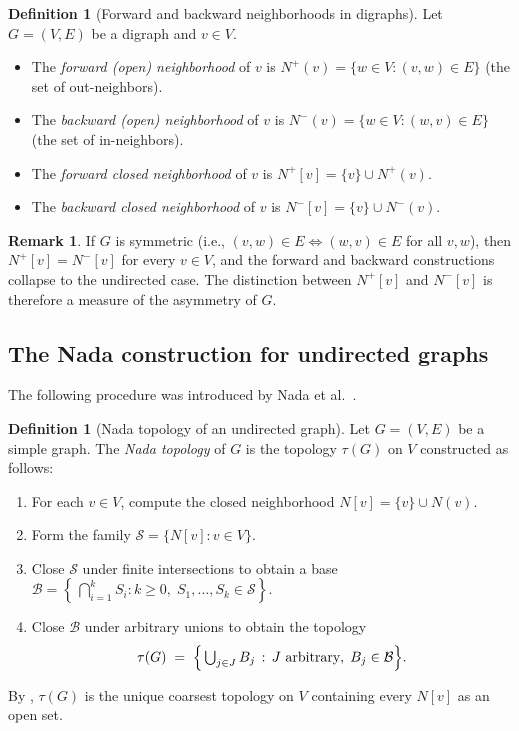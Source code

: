 \documentclass[11pt,a4paper]{article}
\theoremstyle{plain}
\theoremstyle{definition}
\newtheorem{definition}[theorem]{Definition}
\newtheorem{remark}[theorem]{Remark}
\newcommand{\Nfwd}[1]{N^{+}[#1]}
\newcommand{\Nbwd}[1]{N^{-}[#1]}
\newcommand{\Ncl}[1]{N[#1]}
\newcommand{\subbase}{\mathcal{S}}
\newcommand{\base}{\mathcal{B}}
\begin{document}
\begin{definition}[Forward and backward neighborhoods in digraphs]\label{def:directed-nhd}
Let $G = (V, E)$ be a digraph and $v \in V$.
\begin{itemize}[nosep]
  \item The \emph{forward (open) neighborhood} of $v$ is
        $N^{+}(v) = \{w \in V : (v, w) \in E\}$
        (the set of out-neighbors).
  \item The \emph{backward (open) neighborhood} of $v$ is
        $N^{-}(v) = \{w \in V : (w, v) \in E\}$
        (the set of in-neighbors).
  \item The \emph{forward closed neighborhood} of $v$ is
        $\Nfwd{v} = \{v\} \cup N^{+}(v)$.
  \item The \emph{backward closed neighborhood} of $v$ is
        $\Nbwd{v} = \{v\} \cup N^{-}(v)$.
\end{itemize}
\end{definition}

\begin{remark}\label{rem:symmetry-collapse}
If $G$ is symmetric (i.e., $(v,w) \in E \iff (w,v) \in E$ for all $v, w$),
then $\Nfwd{v} = \Nbwd{v}$ for every $v \in V$, and the forward and backward
constructions collapse to the undirected case.  The distinction between $\Nfwd{v}$
and $\Nbwd{v}$ is therefore a measure of the asymmetry of $G$.
\end{remark}

\subsection{The Nada construction for undirected graphs}\label{subsec:nada}

The following procedure was introduced by Nada et al.~\cite{Nada2018}.

\begin{definition}[Nada topology of an undirected graph]\label{def:nada-undirected}
Let $G = (V, E)$ be a simple graph.  The \emph{Nada topology} of $G$ is the
topology $\tau(G)$ on $V$ constructed as follows:
\begin{enumerate}[label=\textbf{Step \arabic*.},nosep]
  \item For each $v \in V$, compute the closed neighborhood
        $\Ncl{v} = \{v\} \cup N(v)$.
  \item Form the family $\subbase = \{\Ncl{v} : v \in V\}$.
  \item Close $\subbase$ under finite intersections to obtain a base
        $\base = \left\{\,\bigcap_{i=1}^{k} S_i : k \geq 0,\;
        S_1, \ldots, S_k \in \subbase\right\}$.
  \item Close $\base$ under arbitrary unions to obtain the topology
        \[
          \tau(G) \;=\; \Bigl\{\,\textstyle\bigcup_{j \in J} B_j \,:\,
          J \text{ arbitrary},\; B_j \in \base\Bigr\}.
        \]
\end{enumerate}
By , $\tau(G)$ is the unique coarsest topology
on $V$ containing every $\Ncl{v}$ as an open set.
\end{definition}
\end{document}

